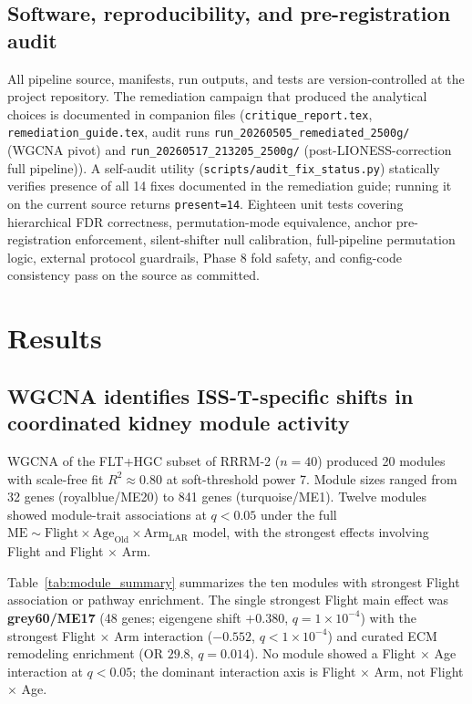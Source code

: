 \documentclass[11pt]{article}
\newcommand{\code}[1]{\texttt{#1}}
\begin{document}
\subsection{Software, reproducibility, and pre-registration audit}

All pipeline source, manifests, run outputs, and tests are version-controlled at the project repository. The remediation campaign that produced the analytical choices is documented in companion files (\code{critique\_report.tex}, \code{remediation\_guide.tex}, audit runs \code{run\_20260505\_remediated\_2500g/} (WGCNA pivot) and \code{run\_20260517\_213205\_2500g/} (post-LIONESS-correction full pipeline)). A self-audit utility (\code{scripts/audit\_fix\_status.py}) statically verifies presence of all 14 fixes documented in the remediation guide; running it on the current source returns \code{present=14}. Eighteen unit tests covering hierarchical FDR correctness, permutation-mode equivalence, anchor pre-registration enforcement, silent-shifter null calibration, full-pipeline permutation logic, external protocol guardrails, Phase 8 fold safety, and config-code consistency pass on the source as committed.

\section{Results}

\subsection{WGCNA identifies ISS-T-specific shifts in coordinated kidney module activity}

WGCNA of the FLT+HGC subset of RRRM-2 ($n{=}40$) produced 20 modules with scale-free fit $R^2\approx 0.80$ at soft-threshold power 7. Module sizes ranged from 32 genes (royalblue/ME20) to 841 genes (turquoise/ME1). Twelve modules showed module-trait associations at $q < 0.05$ under the full $\mathrm{ME} \sim \mathrm{Flight}\times\mathrm{Age}_{\text{Old}}\times\mathrm{Arm}_{\text{LAR}}$ model, with the strongest effects involving Flight and Flight $\times$ Arm.

Table~\ref{tab:module_summary} summarizes the ten modules with strongest Flight association or pathway enrichment. The single strongest Flight main effect was \textbf{grey60/ME17} (48 genes; eigengene shift $+0.380$, $q = 1\times 10^{-4}$) with the strongest Flight $\times$ Arm interaction ($-0.552$, $q < 1\times 10^{-4}$) and curated ECM remodeling enrichment (OR $29.8$, $q = 0.014$). No module showed a Flight $\times$ Age interaction at $q < 0.05$; the dominant interaction axis is Flight $\times$ Arm, not Flight $\times$ Age.
\end{document}

